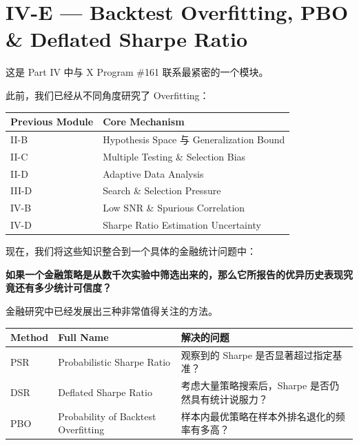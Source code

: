 \hypertarget{part-4-71-0001-iv-e-backtest-overfitting-pbo-deflated-sharpe-ratio}{%
\section{IV-E --- Backtest Overfitting, PBO \& Deflated Sharpe Ratio}\label{part-4-71-0001-iv-e-backtest-overfitting-pbo-deflated-sharpe-ratio}}

这是 Part IV 中与 X Program \#161 联系最紧密的一个模块。

此前，我们已经从不同角度研究了 Overfitting：

\begin{readertable}
\begin{longtable}[]{@{}
  >{\raggedright\arraybackslash}p{}
  >{\raggedright\arraybackslash}p{}@{}}
\toprule
Previous Module & Core Mechanism \\
\midrule
\endhead
II-B & Hypothesis Space 与 Generalization Bound \\
II-C & Multiple Testing \& Selection Bias \\
II-D & Adaptive Data Analysis \\
III-D & Search \& Selection Pressure \\
IV-B & Low SNR \& Spurious Correlation \\
IV-D & Sharpe Ratio Estimation Uncertainty \\
\bottomrule
\end{longtable}
\end{readertable}

现在，我们将这些知识整合到一个具体的金融统计问题中：

\textbf{如果一个金融策略是从数千次实验中筛选出来的，那么它所报告的优异历史表现究竟还有多少统计可信度？}

金融研究中已经发展出三种非常值得关注的方法。

\begin{readertable}
\begin{longtable}[]{@{}
  >{\raggedright\arraybackslash}p{}
  >{\raggedright\arraybackslash}p{}
  >{\raggedright\arraybackslash}p{}@{}}
\toprule
Method & Full Name & 解决的问题 \\
\midrule
\endhead
PSR & Probabilistic Sharpe Ratio & 观察到的 Sharpe 是否显著超过指定基准？ \\
DSR & Deflated Sharpe Ratio & 考虑大量策略搜索后，Sharpe 是否仍然具有统计说服力？ \\
PBO & Probability of Backtest Overfitting & 样本内最优策略在样本外排名退化的频率有多高？ \\
\bottomrule
\end{longtable}
\end{readertable}

